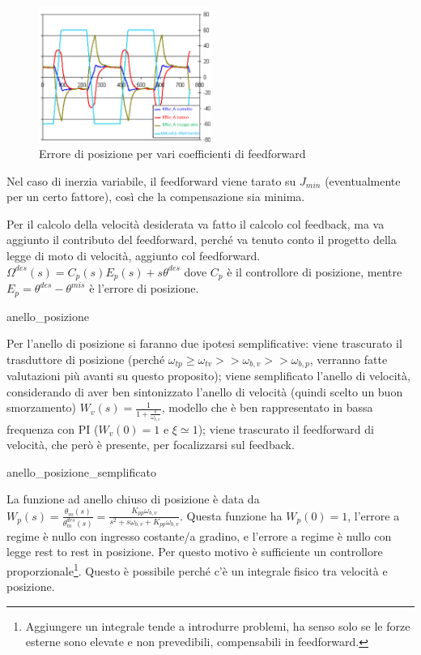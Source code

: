 \begin{figure}[h]
    \centering
    \includegraphics[width=0.5\textwidth]{Immagini/errore_posizione_feedforward.png}
    \caption{Errore di posizione per vari coefficienti di feedforward}
\end{figure}

Nel caso di inerzia variabile, il feedforward viene tarato su \(J_{min}\) (eventualmente per un certo fattore), così che la compensazione sia minima.


Per il calcolo della velocità desiderata va fatto il calcolo col feedback, ma va aggiunto il contributo del feedforward, perché va tenuto conto il progetto della legge di moto di velocità, aggiunto col feedforward.
\(\Omega^{des}(s) = C_p(s)E_p(s) + s\theta^{des}\) dove \(C_p\) è il controllore di posizione, mentre \(E_p = \theta^{des} - \theta^{mis}\) è l'errore di posizione.

{anello_posizione}

Per l'anello  di posizione si faranno due ipotesi semplificative: viene trascurato il trasduttore di posizione (perché \(\omega_{tp}\geqslant \omega_{tv} >> \omega_{b,v} >> \omega_{b,p}\), verranno fatte valutazioni più avanti su questo proposito); viene semplificato l'anello di velocità, considerando di aver ben sintonizzato l'anello di velocità (quindi scelto un buon smorzamento) \(W_v(s)=\frac{1}{1+\frac{s}{\omega_{b,v}}}\), modello che è ben rappresentato in bassa frequenza con PI (\(W_v(0)=1\) e \(\xi \simeq 1\)); viene trascurato il feedforward di velocità, che però è presente, per focalizzarsi sul feedback.

{anello_posizione_semplificato}

La funzione ad anello chiuso di posizione è data da \(W_p(s) = \frac{\theta_m(s)}{\theta_m^{des}(s)} = \frac{K_{pp}\omega_{b,v}}{s^2 + s \omega_{b,v} + K_{pp}\omega_{b,v}}\). Questa funzione ha \(W_p(0) = 1\), l'errore a regime è nullo con ingresso costante/a gradino, e l'errore a regime è nullo con legge rest to rest in posizione.
Per questo motivo è sufficiente un controllore proporzionale\footnote{Aggiungere un integrale tende a introdurre problemi, ha senso solo se le forze esterne sono elevate e non prevedibili, compensabili in feedforward.}. Questo è possibile perché c'è un integrale fisico tra velocità e posizione.

